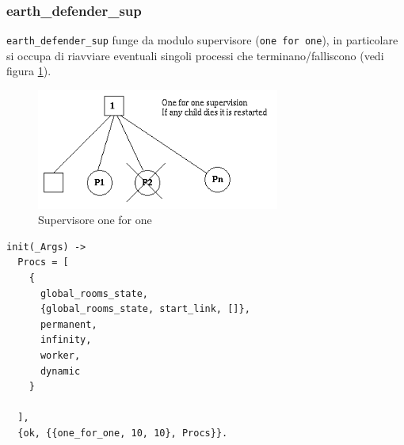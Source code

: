 \documentclass[paper=a4, fontsize=11pt]{scrartcl} %
\numberwithin{equation}{section} %
\numberwithin{figure}{section} %
\numberwithin{table}{section} %
\begin{document}
\subsubsection{earth\_defender\_sup}
\texttt{earth\_defender\_sup} funge da modulo supervisore (\texttt{one for one}), in particolare si occupa di riavviare eventuali singoli processi che terminano/falliscono (vedi figura \ref{Supervisor}).
\begin{figure}
\centering
\includegraphics[width=8cm]{sup4}
\caption{Supervisore one for one}
\label{Supervisor}
\end{figure}
\begin{lstlisting}[basicstyle=\footnotesize]
init(_Args) ->
  Procs = [
    {
      global_rooms_state,
      {global_rooms_state, start_link, []},
      permanent,
      infinity,
      worker,
      dynamic
    }
      
  ],
  {ok, {{one_for_one, 10, 10}, Procs}}.
\end{lstlisting}
\end{document}
